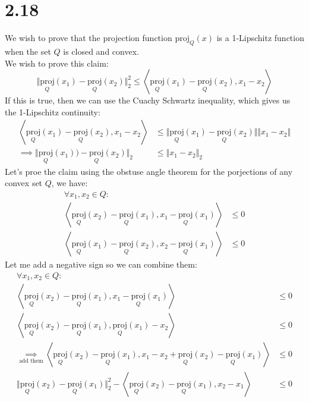 \documentclass[]{article}
\begin{document}
\section*{2.18}
    We wish to prove that the projection function $\text{proj}_Q(x)$ is a 1-Lipschitz function when the set $Q$ is closed and convex. 
    \\[1.1em]
    We wish to prove this claim: 
    $$
        \Vert \underset{Q}{\text{proj}}(x_1) - \underset{Q}{\text{proj}}(x_2)\Vert_2^2
        \le \left\langle 
            \underset{Q}{\text{proj}}(x_1) - \underset{Q}{\text{proj}}(x_2), x_1 - x_2
        \right\rangle
    $$
    If this is true, then we can use the Cuachy Schwartz inequality, which gives us the 1-Lipschitz continuity: 
    \begin{align*}\tag{2.18.1}\label{eqn:2.18.1}
        \left\langle 
            \underset{Q}{\text{proj}}(x_1) - \underset{Q}{\text{proj}}(x_2), x_1 - x_2
        \right\rangle
        &\le 
        \Vert \underset{Q}{\text{proj}}(x_1) - \underset{Q}{\text{proj}}(x_2)\Vert \Vert x_1 - x_2\Vert
        \\
        \implies 
        \Vert \underset{Q}{\text{proj}}(x_1)) - \underset{Q}{\text{proj}}(x_2)\Vert_2 &\le \Vert x_1 - x_2\Vert_2
    \end{align*}
    Let's proe the claim using the obstuse angle theorem for the porjections of any convex set $Q$, we have: 
    \begin{align*}\tag{2.18.2}\label{eqn:2.18.2}
        \forall x_1, x_2 \in Q:&   \\
        \left\langle 
            \underset{Q}{\text{proj}}(x_2) - \underset{Q}{\text{proj}}(x_1), 
            x_1 - \underset{Q}{\text{proj}}(x_1) 
        \right\rangle &\le 0 
        \\
        \left\langle 
        \underset{Q}{\text{proj}}(x_1) - \underset{Q}{\text{proj}}(x_2), 
        x_2 - \underset{Q}{\text{proj}}(x_1) 
        \right\rangle &\le 0
    \end{align*}
    Let me add a negative sign so we can combine them: 
    \begin{align*}\tag{2.18.3}\label{eqn:2.18.3}
        \forall x_1, x_2 \in Q:&   \\
        \left\langle 
            \underset{Q}{\text{proj}}(x_2) - \underset{Q}{\text{proj}}(x_1), 
            x_1 - \underset{Q}{\text{proj}}(x_1) 
        \right\rangle &\le 0 
        \\
        \left\langle 
        \underset{Q}{\text{proj}}(x_2) - \underset{Q}{\text{proj}}(x_1), 
        \underset{Q}{\text{proj}}(x_1)  - x_2
        \right\rangle &\le 0
        \\
        \underset{\text{add them}}{\implies} \left\langle 
            \underset{Q}{\text{proj}}(x_2) - \underset{Q}{\text{proj}}(x_1), 
            x_1 - x_2 + \underset{Q}{\text{proj}}(x_2) - \underset{Q}{\text{proj}}(x_1)
        \right\rangle &\le 0
        \\
        \Vert \underset{Q}{\text{proj}}(x_2) - \underset{Q}{\text{proj}}(x_1)\Vert_2^2 - \left\langle \underset{Q}{\text{proj}}(x_2) - \underset{Q}{\text{proj}}(x_1), x_2 - x_1 \right\rangle &\le 0
    \end{align*}
\end{document}
